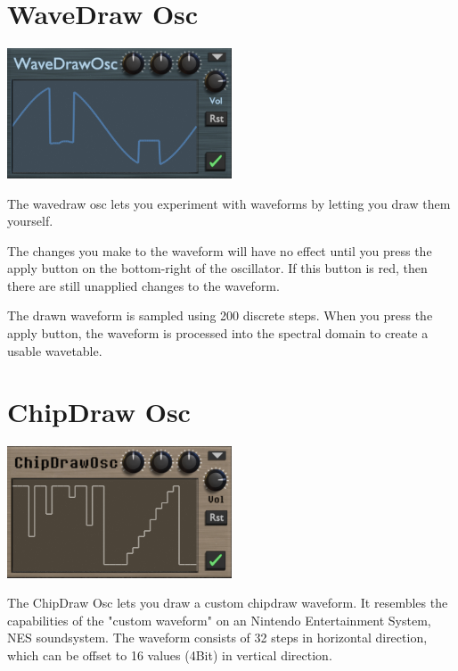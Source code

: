 \section{WaveDraw Osc}
\label{wavedraw}
\begin{center}
    \includegraphics[width=0.5\textwidth]{graphics/wavedraw_osc.png}
\end{center}
The wavedraw osc lets you experiment with waveforms by letting you draw them yourself.

\begin{tcolorbox}[colback=yellow!10!white,
        colframe=white!20!black,
        center,
        valign=top,
        halign=left,
        center title,
        width=\textwidth]

    The changes you make to the waveform will have no effect until you press the apply button on the bottom-right of the oscillator. If this button is red, then there are still unapplied changes to the waveform.
\end{tcolorbox}

The drawn waveform is sampled using 200 discrete steps. When you press the apply button, the waveform is processed into the spectral domain to create a usable wavetable.

\section{ChipDraw Osc}
\label{chipdraw}
\begin{center}
    \includegraphics[width=0.5\textwidth]{graphics/chipdraw_osc.png}
\end{center}
The ChipDraw Osc lets you draw a custom chipdraw waveform. It resembles the capabilities of the "custom waveform" on an Nintendo Entertainment System, NES soundsystem. The waveform consists of 32 steps in horizontal direction, which can be offset to 16 values (4Bit) in vertical direction.

